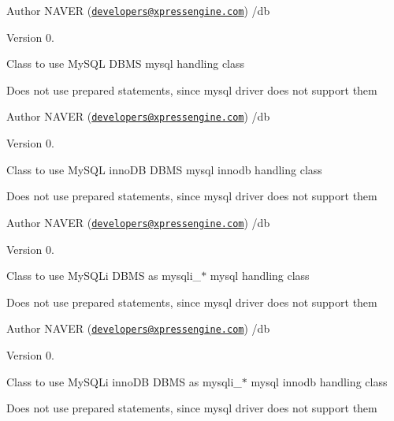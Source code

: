 \begin{DoxyAuthor}{Author}
N\+A\+V\+E\+R (\href{mailto:developers@xpressengine.com}{\tt developers@xpressengine.\+com}) /db 
\end{DoxyAuthor}
\begin{DoxyVersion}{Version}
0.
\end{DoxyVersion}
Class to use My\+S\+Q\+L D\+B\+M\+S mysql handling class

Does not use prepared statements, since mysql driver does not support them

\begin{DoxyAuthor}{Author}
N\+A\+V\+E\+R (\href{mailto:developers@xpressengine.com}{\tt developers@xpressengine.\+com}) /db 
\end{DoxyAuthor}
\begin{DoxyVersion}{Version}
0.
\end{DoxyVersion}
Class to use My\+S\+Q\+L inno\+D\+B D\+B\+M\+S mysql innodb handling class

Does not use prepared statements, since mysql driver does not support them

\begin{DoxyAuthor}{Author}
N\+A\+V\+E\+R (\href{mailto:developers@xpressengine.com}{\tt developers@xpressengine.\+com}) /db 
\end{DoxyAuthor}
\begin{DoxyVersion}{Version}
0.
\end{DoxyVersion}
Class to use My\+S\+Q\+Li D\+B\+M\+S as mysqli\+\_\+$\ast$ mysql handling class

Does not use prepared statements, since mysql driver does not support them

\begin{DoxyAuthor}{Author}
N\+A\+V\+E\+R (\href{mailto:developers@xpressengine.com}{\tt developers@xpressengine.\+com}) /db 
\end{DoxyAuthor}
\begin{DoxyVersion}{Version}
0.
\end{DoxyVersion}
Class to use My\+S\+Q\+Li inno\+D\+B D\+B\+M\+S as mysqli\+\_\+$\ast$ mysql innodb handling class

Does not use prepared statements, since mysql driver does not support them

